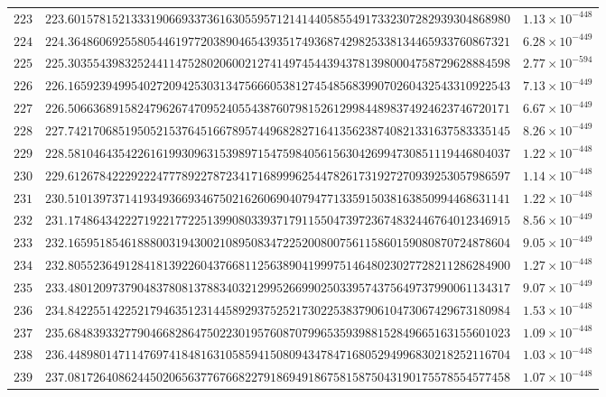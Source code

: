 \documentclass[12pt,reqno]{amsart}
\theoremstyle{remark}
\begin{document}
\begin{longtable}{clc}
$223$ & $223.6015781521333190669337361630559571214144058554917332307282939304868980$ & $1.13\times 10^{-448}$ \\
$224$ & $224.3648606925580544619772038904654393517493687429825338134465933760867321$ & $6.28\times 10^{-449}$ \\
$225$ & $225.3035543983252441147528020600212741497454439437813980004758729628884598$ & $2.77\times 10^{-594}$ \\
$226$ & $226.1659239499540272094253031347566605381274548568399070260432543310922543$ & $7.13\times 10^{-449}$ \\
$227$ & $226.5066368915824796267470952405543876079815261299844898374924623746720171$ & $6.67\times 10^{-449}$ \\
$228$ & $227.7421706851950521537645166789574496828271641356238740821331637583335145$ & $8.26\times 10^{-449}$ \\
$229$ & $228.5810464354226161993096315398971547598405615630426994730851119446804037$ & $1.22\times 10^{-448}$ \\
$230$ & $229.6126784222922247778922787234171689996254478261731927270939253057986597$ & $1.14\times 10^{-448}$ \\
$231$ & $230.5101397371419349366934675021626069040794771335915038163850994468631141$ & $1.22\times 10^{-448}$ \\
$232$ & $231.1748643422271922177225139908033937179115504739723674832446764012346915$ & $8.56\times 10^{-449}$ \\
$233$ & $232.1659518546188800319430021089508347225200800756115860159080870724878604$ & $9.05\times 10^{-449}$ \\
$234$ & $232.8055236491284181392260437668112563890419997514648023027728211286284900$ & $1.27\times 10^{-448}$ \\
$235$ & $233.4801209737904837808137883403212995266990250339574375649737990061134317$ & $9.07\times 10^{-449}$ \\
$236$ & $234.8422551422521794635123144589293752521730225383790610473067429673180984$ & $1.53\times 10^{-448}$ \\
$237$ & $235.6848393327790466828647502230195760870799653593988152849665163155601023$ & $1.09\times 10^{-448}$ \\
$238$ & $236.4489801471147697418481631058594150809434784716805294996830218252116704$ & $1.03\times 10^{-448}$ \\
$239$ & $237.0817264086244502065637767668227918694918675815875043190175578554577458$ & $1.07\times 10^{-448}$ \\

\end{longtable}
\end{document}

